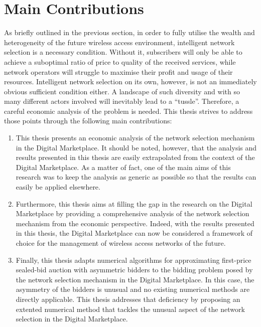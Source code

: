 \section{Main Contributions} %
\label{sec:main_contributions_introduction}
As briefly outlined in the previous section, in order to fully utilise the wealth and heterogeneity of the future wireless access environment, intelligent network selection is a necessary condition. Without it, subscribers will only be able to achieve a suboptimal ratio of price to quality of the received services, while network operators will struggle to maximise their profit and usage of their resources. Intelligent network selection on its own, however, is not an immediately obvious sufficient condition either. A landscape of such diversity and with so many different actors involved will inevitably lead to a ``tussle''. Therefore, a careful economic analysis of the problem is needed. This thesis strives to address those points through the following main contributions:
\begin{enumerate}
\item This thesis presents an economic analysis of the network selection mechanism in the Digital Marketplace. It should be noted, however, that the analysis and results presented in this thesis are easily extrapolated from the context of the Digital Marketplace. As a matter of fact, one of the main aims of this research was to keep the analysis as generic as possible so that the results can easily be applied elsewhere.
\item Furthermore, this thesis aims at filling the gap in the research on the Digital Marketplace by providing a comprehensive analysis of the network selection mechanism from the economic perspective. Indeed, with the results presented in this thesis, the Digital Marketplace can now be considered a framework of choice for the management of wireless access networks of the future.
\item Finally, this thesis adapts numerical algorithms for approximating first-price sealed-bid auction with asymmetric bidders to the bidding problem posed by the network selection mechanism in the Digital Marketplace. In this case, the asymmetry of the bidders is unusual and no existing numerical methods are directly applicable. This thesis addresses that deficiency by proposing an extented numerical method that tackles the unusual aspect of the network selection in the Digital Marketplace.
\end{enumerate}

